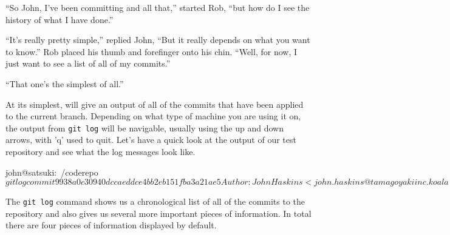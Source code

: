 \begin{trenches}
``So John, I've been committing and all that,'' started Rob,
``but how do I see the history of what I have done.''

``It's really pretty simple,'' replied John,
``But it really depends on what you want to know.''
Rob placed his thumb and forefinger onto his chin.
``Well, for now, I just want to see a list of all of my commits.''

``That one's the simplest of all.''
\end{trenches}

At its simplest,  will give an output of all of the commits that have been applied to the current branch.
Depending on what type of machine you are using it on, the output from \texttt{git log} will be navigable, usually using the up and down arrows, with 'q' used to quit.
Let's have a quick look at the output of our test repository and see what the log messages look like.

\begin{code}
john@satsuki:~/coderepo$ git log
commit 9938a0c30940dccaeddce4bb2eb151fba3a21ae5
Author: John Haskins <john.haskins@tamagoyakiinc.koala>
Date:   Thu Mar 31 20:34:23 2011 +0100

    Finished adding initial files

commit 163f06147a449e724d0cfd484c3334709e8e1fce
Author: John Haskins <john.haskins@tamagoyakiinc.koala>
Date:   Thu Mar 31 20:32:59 2011 +0100

    Made a few changes to first and second files

commit cfe23cbe0150fda69a004e301828097935ec4397
Author: John Haskins <john.haskins@tamagoyakiinc.koala>
Date:   Thu Mar 31 20:27:44 2011 +0100

    My First Ever Commit
john@satsuki:~/coderepo$
\end{code}

The \texttt{git log} command shows us a chronological list of all of the commits to the repository and also gives us several more important pieces of information.
In total there are four pieces of information displayed by default.

